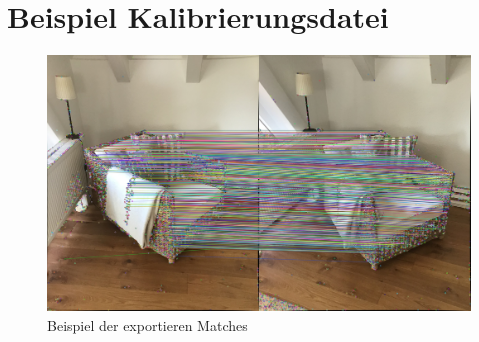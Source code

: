 \section{Beispiel Kalibrierungsdatei}\label{appendix:opencv_filestorage_example}
\begin{figure}
    \centering
    \includegraphics[width=\textwidth]{src/img/image 1 on 2 2071 935.jpg}
    \caption{Beispiel der exportieren Matches}
    \label{fig:example-match-output}
\end{figure}